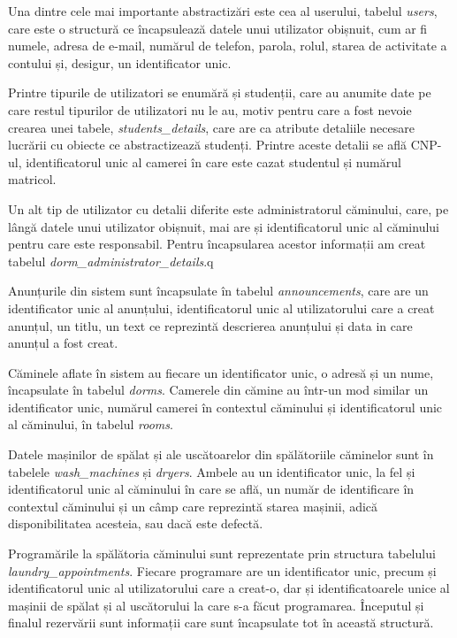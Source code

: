 \documentclass[12pt,a4paper]{report}
\theoremstyle{definition}
\theoremstyle{remark}
\begin{document}
\par Una dintre cele mai importante abstractizări este cea al userului, tabelul {\itshape users}, care este o structură ce încapsulează datele unui utilizator obișnuit, cum ar fi numele, adresa de e-mail, numărul de telefon, parola, rolul, starea de activitate a contului și, desigur, un identificator unic.

\par Printre tipurile de utilizatori se enumără și studenții, care au anumite date pe care restul tipurilor de utilizatori nu le au, motiv pentru care a fost nevoie crearea unei tabele, {\itshape students\_details}, care are ca atribute detaliile necesare lucrării cu obiecte ce abstractizează studenți. Printre aceste detalii se află CNP-ul, identificatorul unic al camerei în care este cazat studentul și numărul matricol.

\par Un alt tip de utilizator cu detalii diferite este administratorul căminului, care, pe lângă datele unui utilizator obișnuit, mai are și identificatorul unic al căminului pentru care este responsabil. Pentru încapsularea acestor informații am creat tabelul {\itshape dorm\_administrator\_details}.q

\par Anunțurile din sistem sunt încapsulate în tabelul {\itshape announcements}, care are un identificator unic al anunțului, identificatorul unic al utilizatorului care a creat anunțul, un titlu, un text ce reprezintă descrierea anunțului și data in care anunțul a fost creat.

\par Căminele aflate în sistem au fiecare un identificator unic, o adresă și un nume, încapsulate în tabelul {\itshape dorms}. Camerele din cămine au într-un mod similar un identificator unic, numărul camerei în contextul căminului și identificatorul unic al căminului, în tabelul {\itshape rooms}.

\par Datele mașinilor de spălat și ale uscătoarelor din spălătoriile căminelor sunt în tabelele {\itshape wash\_machines} și {\itshape dryers}. Ambele au un identificator unic, la fel și identificatorul unic al căminului în care se află, un număr de identificare în contextul căminului și un câmp care reprezintă starea mașinii, adică disponibilitatea acesteia, sau dacă este defectă.

\par Programările la spălătoria căminului sunt reprezentate prin structura tabelului {\itshape laundry\_appointments}. Fiecare programare are un identificator unic, precum și identificatorul unic al utilizatorului care a creat-o, dar și identificatoarele unice al mașinii de spălat și al uscătorului la care s-a făcut programarea. Începutul și finalul rezervării sunt informații care sunt încapsulate tot în această structură.
\end{document}
